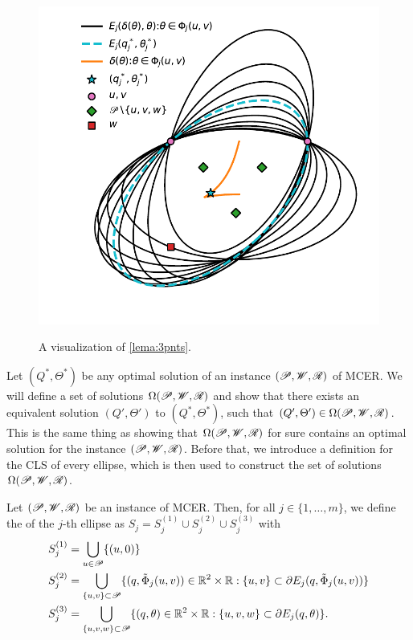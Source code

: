 \begin{figure}[H]
	\centering
	\caption{A visualization of \autoref{lema:3pnts}.}
	\includegraphics[scale=.9]{tex/figures/lema-3-points}
	\fautor
	\label{fig:lema-3-points}
\end{figure}

Let $(Q^*, \Theta^*)$ be any optimal solution of an instance $(\mathscr{P}, \mathscr{W}, \mathscr{R})$ of MCER. We will define a set of solutions $\Omega(\mathscr{P}, \mathscr{W}, \mathscr{R})$ and show that there exists an equivalent solution $(Q', \Theta')$ to  $(Q^*, \Theta^*)$, such that $(Q', \Theta') \in \Omega(\mathscr{P}, \mathscr{W}, \mathscr{R})$. This is the same thing as showing that $\Omega(\mathscr{P}, \mathscr{W}, \mathscr{R})$ for sure contains an optimal solution for the instance $(\mathscr{P}, \mathscr{W}, \mathscr{R})$.
Before that, we introduce a definition for the CLS of every ellipse, which is then used to construct the set of solutions $\Omega(\mathscr{P}, \mathscr{W}, \mathscr{R})$.

\begin{definicao}\label{def:Sj}
	Let $(\mathscr{P}, \mathscr{W}, \mathscr{R})$ be an instance of MCER. Then, for all $j\in\{1, \dots, m\}$, we define the  of the $j$-th ellipse as $S_j = S_j^{(1)} \cup S_j^{(2)} \cup S_j^{(3)}$ with
	\begin{align}
		S_j^{(1)} &= \bigcup_{u \in \mathscr{P}} \{(u, 0)\}\\
		S_j^{(2)} &= \bigcup_{\{u, v\} \subset \mathscr{P}} \{(q, \tilde{\Phi}_j(u,v))\in \mathbb{R}^2\times\mathbb{R}: \{u,v\} \subset \partial E_j(q, \tilde{\Phi}_j(u,v))\}\\
		S_j^{(3)} &= \bigcup_{\{u, v, w\} \subset \mathscr{P}} \{(q, \theta)\in \mathbb{R}^2\times\mathbb{R}: \{u, v, w\} \subset \partial E_j(q, \theta)\}.
	\end{align}
\end{definicao}

